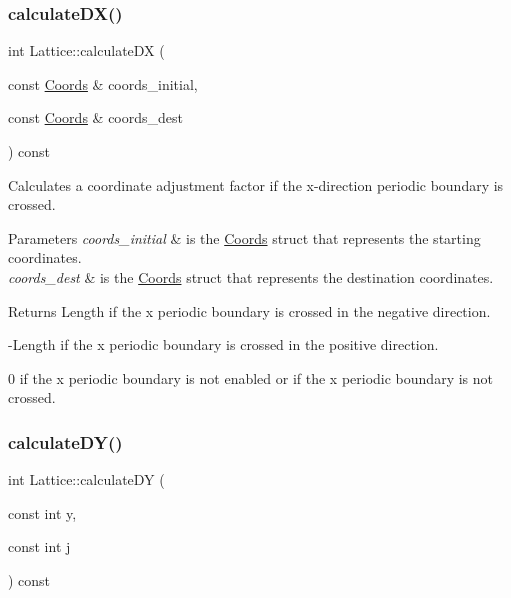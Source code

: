 \subsubsection{\texorpdfstring{calculate\+D\+X()}{calculateDX()}\hspace{0.1cm}{\footnotesize\ttfamily [2/2]}}
{\footnotesize\ttfamily int Lattice\+::calculate\+DX (\begin{DoxyParamCaption}\item[{const \hyperlink{struct_coords}{Coords} \&}]{coords\+\_\+initial,  }\item[{const \hyperlink{struct_coords}{Coords} \&}]{coords\+\_\+dest }\end{DoxyParamCaption}) const}



Calculates a coordinate adjustment factor if the x-\/direction periodic boundary is crossed. 


\begin{DoxyParams}{Parameters}
{\em coords\+\_\+initial} & is the \hyperlink{struct_coords}{Coords} struct that represents the starting coordinates. \\
\hline
{\em coords\+\_\+dest} & is the \hyperlink{struct_coords}{Coords} struct that represents the destination coordinates. \\
\hline
\end{DoxyParams}
\begin{DoxyReturn}{Returns}
Length if the x periodic boundary is crossed in the negative direction. 

-\/\+Length if the x periodic boundary is crossed in the positive direction. 

0 if the x periodic boundary is not enabled or if the x periodic boundary is not crossed. 
\end{DoxyReturn}
\mbox{\label{class_lattice_acdeca889f7df11fe299f8b7941198c83}} 
\subsubsection{\texorpdfstring{calculate\+D\+Y()}{calculateDY()}\hspace{0.1cm}{\footnotesize\ttfamily [1/2]}}
{\footnotesize\ttfamily int Lattice\+::calculate\+DY (\begin{DoxyParamCaption}\item[{const int}]{y,  }\item[{const int}]{j }\end{DoxyParamCaption}) const}



